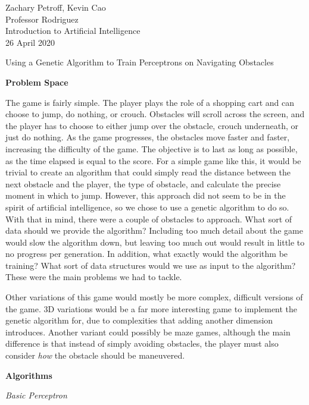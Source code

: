 \documentclass[12pt]{article}
\begin{document}
\begin{flushleft}
Zachary Petroff, Kevin Cao \\
Professor Rodriguez \\
Introduction to Artificial Intelligence \\
26 April 2020

\begin{center}
Using a Genetic Algorithm to Train Perceptrons on Navigating Obstacles
\end{center}

\setlength{\parindent}{0.5in}
\noindent\textbf{Problem Space}

The game is fairly simple. The player plays the role of a shopping cart and can choose to jump, do nothing, or crouch. Obstacles will scroll across the screen, and the player has to choose to either jump over the obstacle, crouch underneath, or just do nothing. As the game progresses, the obstacles move faster and faster, increasing the difficulty of the game. The objective is to last as long as possible, as the time elapsed is equal to the score.
For a simple game like this, it would be trivial to create an algorithm that could simply read the distance between the next obstacle and the player, the type of obstacle, and calculate the precise moment in which to jump. However, this approach did not seem to be in the spirit of artificial intelligence, so we chose to use a genetic algorithm to do so. With that in mind, there were a couple of obstacles to approach. What sort of data should we provide the algorithm? Including too much detail about the game would slow the algorithm down, but leaving too much out would result in little to no progress per generation. In addition, what exactly would the algorithm be training? What sort of data structures would we use as input to the algorithm? These were the main problems we had to tackle.

Other variations of this game would mostly be more complex, difficult versions of the game. 3D variations would be a far more interesting game to implement the genetic algorithm for, due to complexities that adding another dimension introduces. Another variant could possibly be maze games, although the main difference is that instead of simply avoiding obstacles, the player must also consider \emph{how} the obstacle should be maneuvered.

\hfill

\noindent\textbf{Algorithms}

\noindent\emph{Basic Perceptron}



\end{flushleft}
\end{document}
